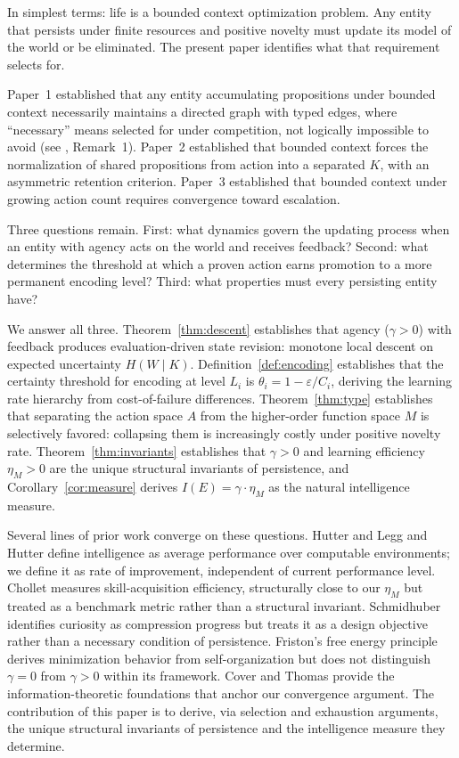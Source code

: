 \documentclass[11pt]{article}
\theoremstyle{definition}
\theoremstyle{remark}
\begin{document}
In simplest terms: life is a bounded context optimization problem. Any entity that persists under finite resources and positive novelty must update its model of the world or be eliminated. The present paper identifies what that requirement selects for.

Paper~1 \cite{McCarthy2026a} established that any entity accumulating
propositions under bounded context necessarily maintains a directed
graph with typed edges, where ``necessary'' means selected for under
competition, not logically impossible to avoid (see \cite{McCarthy2026a},
Remark~1). Paper~2 \cite{McCarthy2026b} established that bounded context forces the
normalization of shared propositions from action into a separated $K$,
with an asymmetric retention criterion. Paper~3 \cite{McCarthy2026c} established that
bounded context under growing action count requires convergence toward
escalation.

Three questions remain. First: what dynamics govern the updating
process when an entity with agency acts on the world and receives
feedback? Second: what determines the threshold at which a proven
action earns promotion to a more permanent encoding level? Third:
what properties must every persisting entity have?

We answer all three. Theorem~\ref{thm:descent} establishes that
agency ($\gamma > 0$) with feedback produces evaluation-driven state
revision: monotone local descent on expected uncertainty
$H(W \mid K)$. Definition~\ref{def:encoding} establishes that the
certainty threshold for encoding at level $L_i$ is
$\theta_i = 1 - \varepsilon / C_i$, deriving the learning rate
hierarchy from cost-of-failure differences.
Theorem~\ref{thm:type} establishes that separating the action space
$A$ from the higher-order function space $M$ is selectively favored:
collapsing them is increasingly costly under positive novelty rate.
Theorem~\ref{thm:invariants} establishes that $\gamma > 0$ and
learning efficiency $\eta_M > 0$ are the unique structural invariants
of persistence, and Corollary~\ref{cor:measure} derives
$I(E) = \gamma \cdot \eta_M$ as the natural intelligence measure.

Several lines of prior work converge on these questions.
Hutter
\cite{Hutter2005} and Legg and Hutter \cite{LeggHutter2007} define
intelligence as average performance over computable environments;
we define it as rate of improvement, independent of current
performance level. Chollet \cite{Chollet2019} measures
skill-acquisition efficiency, structurally close to our $\eta_M$ but
treated as a benchmark metric rather than a structural invariant.
Schmidhuber \cite{Schmidhuber2010} identifies curiosity as compression
progress but treats it as a design objective rather than a necessary
condition of persistence. Friston's free energy principle
\cite{Friston2010} derives minimization behavior from
self-organization but does not distinguish $\gamma = 0$ from
$\gamma > 0$ within its framework. Cover and Thomas \cite{Cover2006}
provide the information-theoretic foundations that anchor our
convergence argument. The contribution of this paper is to derive,
via selection and exhaustion arguments, the unique structural
invariants of persistence and the intelligence measure they determine.
\end{document}
